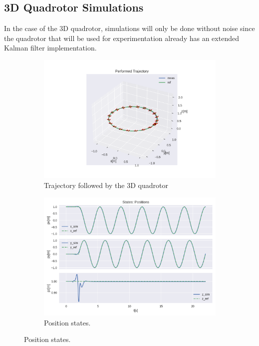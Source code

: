 \documentclass{thesisreport}
\begin{document}
\subsection{3D Quadrotor Simulations}

In the case of the 3D quadrotor, simulations will only be done without noise since the quadrotor that will be used for experimentation already has an extended Kalman filter implementation.

\newpage

\begin{figure}[H]
	\begin{subfigure}{0.45\textwidth}
		\includegraphics[width=\linewidth]{Images/acados_simulations/circular_trajectory/3D_quadrotor/sim3D.png}
		\caption{Trajectory followed by the 3D quadrotor} \label{fig:3D_sim_3d}
	\end{subfigure}\hspace*{\fill}
	\begin{subfigure}{0.45\textwidth}
		\includegraphics[width=\linewidth]{Images/acados_simulations/circular_trajectory/3D_quadrotor/posStates.png}
		\caption{Position states.} \label{fig:3D_sim_pose}
	\end{subfigure}


\end{figure}
\end{document}
